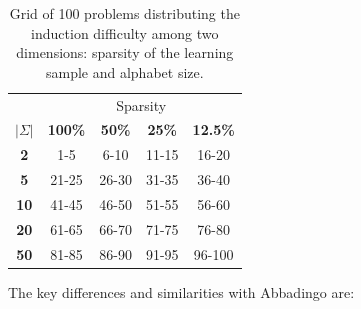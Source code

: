 \begin{table}[h]
\begin{center}
\begin{tabular}{c|c c c c}
&\multicolumn{4}{|c}{Sparsity}\\ 
\textbf{$|\Sigma|$} & \textbf{100\%} & \textbf{50\%} & \textbf{25\%} & \textbf{12.5\%}\\
\hline
\textbf{2}  & 1-5   & 6-10  & 11-15 & 16-20 \\
\textbf{5}  & 21-25 & 26-30 & 31-35 & 36-40 \\
\textbf{10} & 41-45 & 46-50 & 51-55 & 56-60 \\
\textbf{20} & 61-65 & 66-70 & 71-75 & 76-80 \\
\textbf{50} & 81-85 & 86-90 & 91-95 & 96-100\\
\end{tabular}
\end{center}
\caption{\label{stamina:table:problem-grid}Grid of 100 problems distributing the induction difficulty among two dimensions: sparsity of the learning sample and alphabet size.}
\end{table}

\noindent The key differences and similarities with Abbadingo are:

